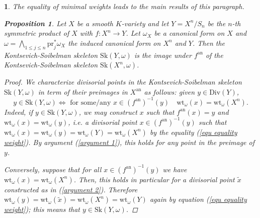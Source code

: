 \documentclass{amsart}%
\numberwithin{equation}{subsection}
\theoremstyle{plain2}
\newtheorem{prop}[equation]{Proposition}
\theoremstyle{definition2}
\theoremstyle{stepstyle}
\theoremstyle{point}
\theoremstyle{subpoint}
\newtheorem{subpoint}[equation]{}%
\newcommand{\spa}[1]{\begin{subpoint}#1\end{subpoint}}           %
\newcommand{\pr}{\mathrm{pr}}
\newcommand{\an}{\mathrm{an}}
\newcommand{\weight}{\mathrm{wt}}
\newcommand{\Sk}{\mathrm{Sk}}
\begin{document}
\spa{The equality of minimal weights leads to the main results of this paragraph.
\begin{prop} \label{prop KS of quotient}
Let $X$ be a smooth $K$-variety and let $Y=X^n/S_n$ be the $n$-th symmetric product of $X$ with $f:X^n \rightarrow Y$. Let $\omega_X$ be a canonical form on $X$ and $\omega= \bigwedge_{1\leqslant j \leqslant n} \pr_j^*\omega_X$ the induced canonical form on $X^n$ and $Y$. Then the Kontsevich-Soibelman skeleton $\Sk(Y,\omega)$ is the image under $f^\an$ of the Kontsevich-Soibelman skeleton $\Sk(X^n,\omega)$. 
\end{prop}
\begin{proof}
We characterize divisorial points in the Kontsevich-Soibelman skeleton $\Sk(Y,\omega)$ in term of their preimages in $X^{\an}$ as follows: given $y \in \text{Div}(Y)$, $$y \in \Sk(Y,\omega) \Leftrightarrow \text{ for some/any } x \in (f^\an)^{-1}(y) \quad \weight_{\omega}(x)=\weight_{\omega}(X^n).$$
Indeed, if $y \in \Sk(Y,\omega)$, we may construct $ x$ such that $ f^\an(x)=y$ and $ \weight_{\omega}(x)=\weight_{\omega}(y)$, i.e. a divisorial point $x \in (f^\an)^{-1}(y)$ such that $\weight_{\omega}(x)=\weight_{\omega}(y)=\weight_{\omega}(Y)=\weight_{\omega}(X^n)$ by the equality (\ref{equ equality weight}). By argument (\ref{argument 1}), this holds for any point in the preimage of $y$.

Conversely, suppose that for all $x \in (f^\an)^{-1}(y)$ we have $\weight_{\omega}(x)= \weight_{\omega}(X^n)$. Then, this holds in particular for a divisorial point $\tilde{x}$ constructed as in (\ref{argument 2}). Therefore $\weight_{\omega}(y)=\weight_{\omega}(\tilde{x})=\weight_{\omega}(X^n)= \weight_{\omega}(Y)$ again by equation (\ref{equ equality weight}); this means that $y \in \Sk(Y, \omega)$.
\end{proof}

}
\end{document}
